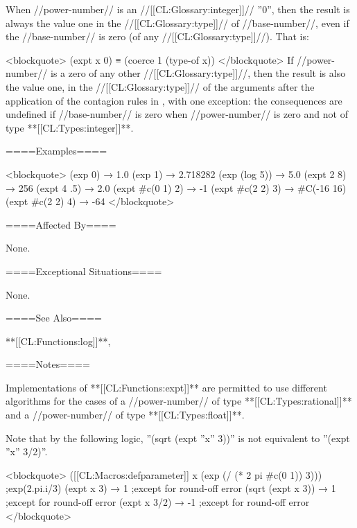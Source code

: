 When //power-number// is an //[[CL:Glossary:integer]]// ''0'', then the result is always the value one in the //[[CL:Glossary:type]]// of //base-number//, even if the //base-number// is zero (of any //[[CL:Glossary:type]]//). That is:

<blockquote> (expt x 0) ≡ (coerce 1 (type-of x)) </blockquote> If //power-number// is a zero of any other //[[CL:Glossary:type]]//, then the result is also the value one, in the //[[CL:Glossary:type]]// of the arguments after the application of the contagion rules in \secref\NumericContagionRules, with one exception: the consequences are undefined if //base-number// is zero when //power-number// is zero and not of type **[[CL:Types:integer]]**.

====Examples====

<blockquote> (exp 0) → 1.0 (exp 1) → 2.718282 (exp (log 5)) → 5.0 (expt 2 8) → 256 (expt 4 .5) → 2.0 (expt #c(0 1) 2) → -1 (expt #c(2 2) 3) → #C(-16 16) (expt #c(2 2) 4) → -64 </blockquote>

====Affected By====

None.

====Exceptional Situations====

None.

====See Also====

**[[CL:Functions:log]]**, {\secref\FloatSubstitutability}

====Notes====

Implementations of **[[CL:Functions:expt]]** are permitted to use different algorithms for the cases of a //power-number// of type **[[CL:Types:rational]]** and a //power-number// of type **[[CL:Types:float]]**.


Note that by the following logic, ''(sqrt (expt ''x'' 3))'' is not equivalent to ''(expt ''x'' 3/2)''.

<blockquote> ([[CL:Macros:defparameter]] x (exp (/ (* 2 pi #c(0 1)) 3))) ;exp(2.pi.i/3) (expt x 3) → 1 ;except for round-off error (sqrt (expt x 3)) → 1 ;except for round-off error (expt x 3/2) → -1 ;except for round-off error </blockquote>

  
